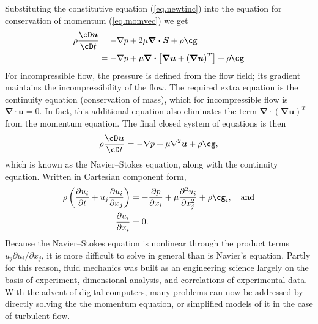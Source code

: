 \documentclass[twoside,11pt]		{report}
\begin{document}
Substituting the constitutive equation (\ref{eq.newtinc}) into the
equation for conservation of momentum (\ref{eq.momvec}) we get
\begin{align}
\rho\frac{\cD \bm{u}}{\cD t}
&=
-\nabla p + 2\mu\bm{\nabla\cdot S} +
 \rho\bm{\cg}\\
&=
-\nabla p+\mu\bm{\nabla\cdot}\left[\bm{\nabla u}+(\bm{\nabla u})^T\right] + 
 \rho\bm{\cg}
\end{align}
For incompressible flow, the pressure is defined from the flow field;
its gradient maintains the incompressibility of the flow. The required
extra equation is the continuity equation (conservation of mass),
which for incompressible flow is $\bm{\nabla\cdot u}=0$.  In fact,
this additional equation also eliminates the term
$\bm{\nabla\cdot}(\bm{\nabla u})^T$ from the momentum equation. The
final closed system of equations is then
\begin{equation}
\rho\frac{\cD \bm{u}}{\cD t}
=
-\nabla p+\mu\nabla^2\bm{u} + \rho\bm{\cg},
\end{equation}
which is known as the Navier--Stokes equation, along with the
continuity equation.
Written in Cartesian component form,
\begin{align}
\rho\left(\frac{\partial u_i}{\partial t} + u_j\frac{\partial
  u_i}{\partial x_j}\right)
&=
-\frac{\partial p}{\partial x_i} + \mu \frac{\partial^2 u_i}{\partial x_j^2} +
\rho\cg_i, \quad\textrm{and}\\
\frac{\partial u_i}{\partial x_i}
&=
0.
\end{align}
Because the Navier--Stokes equation is nonlinear through the product
terms $u_j\partial u_i/\partial x_j$, it is more difficult to solve in
general than is Navier's equation. Partly for this reason, fluid
mechanics was built as an engineering science largely on the basis of
experiment, dimensional analysis, and correlations of experimental
data. With the advent of digital computers, many problems can now be
addressed by directly solving the the momentum equation, or simplified
models of it in the case of turbulent flow.



\end{document}
